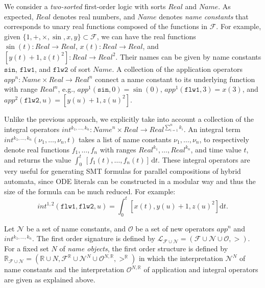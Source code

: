 We consider a \emph{two-sorted} first-order logic with sorts $\mathit{Real}$ and $\mathit{Name}$.
As expected, $\mathit{Real}$ denotes real numbers,
and $\mathit{Name}$ denotes \emph{name constants} that corresponds to 
unary real functions composed of the functions in $\mathcal{F}$.
For example, given $\{1, +, \times, \sin, x, y\} \subset \mathcal{F}$, 
we can have the real functions
$\sin(t) :\mathit{Real} \to \mathit{Real}$,
$x(t) :\mathit{Real} \to \mathit{Real}$,
and
$[y(t) + 1, z(t)^2] :  \mathit{Real} \to \mathit{Real}^2$.
Their names can be given by name constants 
$\texttt{sin}$, $\texttt{flw1}$, and  $\texttt{flw2}$ of sort $\mathit{Name}$.
%
A collection of the application operators $\mathit{app}^n : \mathit{Name} \times \mathit{Real} \to \mathit{Real}^n$
connect a name constant to its underlying function with range $\mathit{Real}^n$, e.g.,
$\mathit{app}^1(\texttt{sin}, 0) = \sin(0)$,
$\mathit{app}^1(\texttt{flw1}, 3) = x(3)$,
and
$\mathit{app}^2(\texttt{flw2}, u) = 
[y(u) + 1,z(u)^2]$.

Unlike the previous approach,
we explicitly take into account
a collection of the integral operators $\mathit{int}^{k_1,\ldots,k_n} : 
\mathit{Name}^n \times \mathit{Real} \to \mathit{Real}^{\sum_{i=1}^n k_i}$.
An integral term
$\mathit{int}^{k_1,\ldots,k_n}(\nu_1,\ldots,\nu_n,t)$
takes a list of name constants $\nu_1,\ldots,\nu_n$,
to respectively denote real functions $f_1,\ldots,f_n$ with ranges $\mathit{Real}^{k_1},\ldots,\mathit{Real}^{k_n}$,
and time value $t$,
and returns the value $\int_0^t \, [f_1(t),\ldots,f_n(t)] \,\mathrm{d}t$.  
These integral operators are very useful for generating SMT formulas
for parallel compositions of hybrid automata,
since ODE literals can be constructed in a modular way
and thus the size of the formula can be much reduced.
For example:
\[
\mathit{int}^{1,2}(\texttt{flw1},\texttt{flw2}, u) 
= 
\int_0^t 
[x(t),y(u) + 1,z(u)^2]
\mathrm{d}t.
\]

\begin{definition}
Let $\mathcal{N}$ be a  set of name constants,
and  $\mathcal{O}$ be a set  of new operators %
$\mathit{app}^n$
and %
$\mathit{int}^{k_1,\ldots,k_n}$.
%
The first order signature is defined by 
$\mathcal{L}_{\mathcal{F}\cup\mathcal{N}} = (\mathcal{F} \cup \mathcal{N} \cup \mathcal{O}, >)$.
For a fixed set $N$ of \emph{name objects},
the first order structure is defined by
$\mathbb{R}_{\mathcal{F}\cup\mathcal{N}} 
= (\mathbb{R} \cup N, \mathcal{F}^\mathbb{R} \cup \mathcal{N}^N \cup \mathcal{O}^{N,\mathbb{R}}, >^\mathbb{R})$
in which the interpretation $\mathcal{N}^N$ of name constants and 
the interpretation $\mathcal{O}^{N,\mathbb{R}}$ of application and integral operators 
are given as explained above.
\end{definition}

